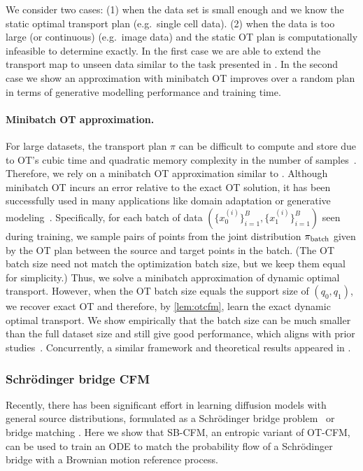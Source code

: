 \documentclass[10pt]{article}
\theoremstyle{plain}
\theoremstyle{definition}
\theoremstyle{remark}
\begin{document}
{We consider two cases: (1) when the data set is small enough and we know the static optimal transport plan (e.g.\ single cell data). (2) when the data is too large (or continuous) (e.g.\ image data) and the static OT plan is computationally infeasible to determine exactly. In the first case we are able to extend the transport map to unseen data similar to the task presented in \cite{Bunne2023}. In the second case we show an approximation with minibatch OT improves over a random plan in terms of generative modelling performance and training time. }


\paragraph{Minibatch OT approximation.} For large datasets, the transport plan $\pi$ can be difficult to compute and store due to OT's cubic time and quadratic memory complexity in the number of samples~\citep{cuturi_sinkhorn_2013,tong_trajectorynet_2020}. {Therefore, we rely on} a minibatch OT approximation similar to \citet{fatras_minibatch_2021}. Although minibatch OT incurs an error relative to the exact OT solution, it has been successfully used in many applications like domain adaptation or generative modeling~\citep{Damodarandeepjdot2018, genevay_2018}. Specifically, for each batch of data $(\{x_0^{(i)}\}_{i=1}^B,\{x_1^{(i)}\}_{i=1}^B)$ seen during training, we sample pairs of points from the joint distribution $\pi_{\rm batch}$ given by the OT plan between the source and target points in the batch. (The OT batch size need not match the optimization batch size, but we keep them equal for simplicity.) Thus, we solve a minibatch approximation of dynamic optimal transport. However, when the OT batch size equals the support size of $(q_0, q_1)$, we recover exact OT and therefore, by \autoref{lem:otcfm}, learn the exact dynamic optimal transport. We show empirically that the batch size can be much smaller than the full dataset size and still give good performance, which aligns with prior studies~\citep{fatras_learning_2020,fatras_unbalanced_2021}. {Concurrently, a similar framework and theoretical results appeared in \cite{pooladian_2023_multisample}.}

\subsubsection{Schr\"odinger bridge CFM}
\label{sec:sb_flow}

Recently, there has been significant effort in learning diffusion models with general source distributions, formulated as a Schr\"odinger bridge problem~\citep{de_bortoli_diffusion_2021,vargas_solving_2021, chen_likelihood_2022} or bridge matching \cite{peluchetti2022nondenoising, liu2022let, ye2022hitting}. Here we show that SB-CFM, an entropic variant of OT-CFM, can be used to train an ODE to match the probability flow of a Schr\"odinger bridge with a Brownian motion reference process.
\end{document}
